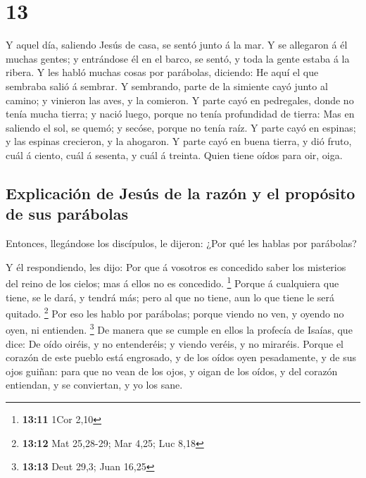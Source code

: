 \hypertarget{section-12}{%
\section{13}\label{section-12}}

 Y aquel día, saliendo Jesús de casa, se sentó junto á la
mar.  Y se allegaron á él muchas gentes; y entrándose él en
el barco, se sentó, y toda la gente estaba á la ribera.  Y
les habló muchas cosas por parábolas, diciendo: He aquí el que sembraba
salió á sembrar.  Y sembrando, parte de la simiente cayó
junto al camino; y vinieron las aves, y la comieron.  Y
parte cayó en pedregales, donde no tenía mucha tierra; y nació luego,
porque no tenía profundidad de tierra:  Mas en saliendo el
sol, se quemó; y secóse, porque no tenía raíz.  Y parte cayó
en espinas; y las espinas crecieron, y la ahogaron.  Y parte
cayó en buena tierra, y dió fruto, cuál á ciento, cuál á sesenta, y cuál
á treinta.  Quien tiene oídos para oir, oiga.

\hypertarget{explicaciuxf3n-de-jesuxfas-de-la-razuxf3n-y-el-propuxf3sito-de-sus-paruxe1bolas}{%
\subsection{Explicación de Jesús de la razón y el propósito de sus
parábolas}\label{explicaciuxf3n-de-jesuxfas-de-la-razuxf3n-y-el-propuxf3sito-de-sus-paruxe1bolas}}

 Entonces, llegándose los discípulos, le dijeron: ¿Por qué
les hablas por parábolas?

 Y él respondiendo, les dijo: Por que á vosotros es
concedido saber los misterios del reino de los cielos; mas á ellos no es
concedido. \footnote{\textbf{13:11} 1Cor 2,10}  Porque á
cualquiera que tiene, se le dará, y tendrá más; pero al que no tiene,
aun lo que tiene le será quitado. \footnote{\textbf{13:12} Mat 25,28-29;
  Mar 4,25; Luc 8,18}  Por eso les hablo por parábolas;
porque viendo no ven, y oyendo no oyen, ni entienden. \footnote{\textbf{13:13}
  Deut 29,3; Juan 16,25}  De manera que se cumple en ellos
la profecía de Isaías, que dice: De oído oiréis, y no entenderéis; y
viendo veréis, y no miraréis.  Porque el corazón de este
pueblo está engrosado, y de los oídos oyen pesadamente, y de sus ojos
guiñan: para que no vean de los ojos, y oigan de los oídos, y del
corazón entiendan, y se conviertan, y yo los sane.

